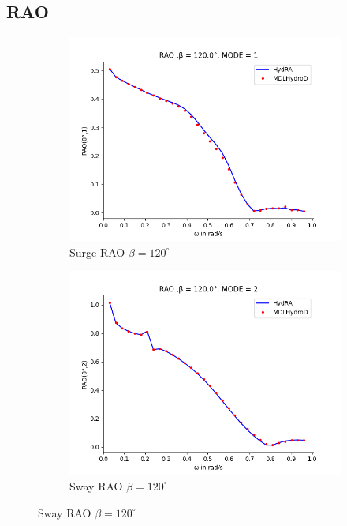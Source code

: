 \subsection{RAO}
\begin{figure}[H]
    \centering
    \begin{subfigure}[b]{0.45\textwidth}
        \includegraphics[width=\textwidth]{plots/kcs/rao/rao1.png}
        \caption{Surge RAO $\beta = 120^{\circ}$}
    \end{subfigure}
    \begin{subfigure}[b]{0.45\textwidth}
        \includegraphics[width=\textwidth]{plots/kcs/rao/rao2.png}
        \caption{Sway RAO $\beta = 120^{\circ}$}
    \end{subfigure}

\end{figure}
